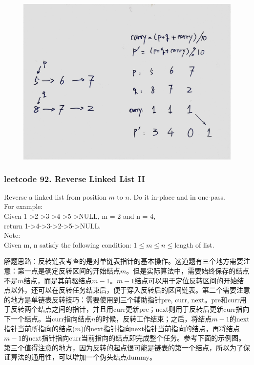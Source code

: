 \documentclass[a4paper,10pt]{article}
\begin{document}
\begin{figure}[h]
    \includegraphics[width=\textwidth]{leetcode2.jpg}
    \centering \\
\end{figure}



\subsubsection{leetcode 92. Reverse Linked List II}
Reverse a linked list from position $m$ to $n$. Do it in-place and in one-pass. \\

\noindent For example: \\
\indent Given 1->2->3->4->5->NULL, m = 2 and n = 4, \\
\indent return 1->4->3->2->5->NULL. \\

\noindent Note: \\
\indent Given m, n satisfy the following condition: $1 \leq m \leq n \leq $length of list. \\

\begin{CJK*}{UTF8}{gbsn}
\noindent 解题思路：反转链表考查的是对单链表指针的基本操作。这道题有三个地方需要注意：第一点是确定反转区间的开始结点$m$。但是实际算法中，需要始终保存的结点不是$m$结点，而是其前驱结点$m-1$。$m-1$结点可以用于定位反转区间的开始结点以外，还可以在反转任务结束后，便于穿入反转后的区间链表。第二个需要注意的地方是单链表反转技巧：需要使用到三个辅助指针pre, curr, next。pre和curr用于反转两个结点之间的指针，并且用curr更新pre；next则用于反转后更新curr指向下一个结点。当curr指向结点$n$的时候，反转工作结束；之后，将结点$m-1$的next指针当前所指向的结点($m$)的next指针指向next指针当前指向的结点，再将结点$m-1$的next指针指向curr当前指向的结点即完成整个任务。参考下面的示例图。第三个值得注意的地方，因为反转的起点很可能是链表的第一个结点，所以为了保证算法的通用性，可以增加一个伪头结点dummy。
\end{CJK*}
\end{document}
